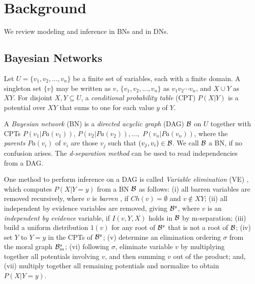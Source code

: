 \chapter{Background}
\label{sec:background}

\reversemarginpar

We review modeling and inference in BNs and in DNs.

\section{Bayesian Networks}
\label{sec:baysian_networks}

Let $U = \{ v_1, v_2, \ldots , v_n \}$ be a finite set of variables, each with a finite domain.
A singleton set $\{v\}$ may be written as $v$, $\{ v_1, v_2, \ldots, v_n \}$ as $v_1 v_2 \cdots v_n$, and $X \cup Y$ as $XY$.
For disjoint $X,Y \subseteq U$, a \emph{conditional probability table} (CPT) $P(X|Y)$ is a potential over $XY$ that sums to one for each value $y$ of $Y$.

A \emph{Bayesian network} (BN) \cite{pear88} is a \emph{directed acyclic graph} (DAG) $\cal{B}$ on $U$ together with CPTs $P(v_1 | Pa(v_1))$, $P(v_2|Pa(v_2)),$$\ldots,$ $P(v_n|Pa(v_n))$, where the \emph{parents} $Pa(v_i)$ of $v_i$ are those $v_j$ such that $(v_j,v_i) \in \cal{B}$.
We call $\cal{B}$ a BN, if no confusion arises.
The \emph{d-separation method} \cite{pear88} can be used to read independencies from a DAG.


One method to perform inference on a DAG is called \emph{Variable elimination} (VE) \cite{zhan94}, which computes $P(X|Y=y)$ from a BN $\cal{B}$ as follows:
(i) all barren variables are removed recursively, where $v$ is \emph{barren} \cite{zhan94}, if $Ch(v) = \emptyset$ and $v \not\in XY$;
(ii) all independent by evidence variables are removed, giving ${\cal{B}}^s$, where $v$ is an \emph{independent by evidence} variable, if $I(v,Y,X)$ holds in $\cal{B}$ by m-separation;
(iii) build a uniform distribution $1(v)$ for any root of ${\cal{B}}^s$ that is not a root of $\cal{B}$;
(iv) set $Y$ to $Y=y$ in the CPTs of ${\cal{B}}^s$;
(v) determine an elimination ordering $\sigma$ from the moral graph ${\cal{B}}^{s}_{m}$;
(vi) following $\sigma$, eliminate variable $v$ by multiplying together all potentials involving $v$, and then summing $v$ out of the product;
and, (vii) multiply together all remaining potentials and normalize to obtain $P(X|Y=y)$.


